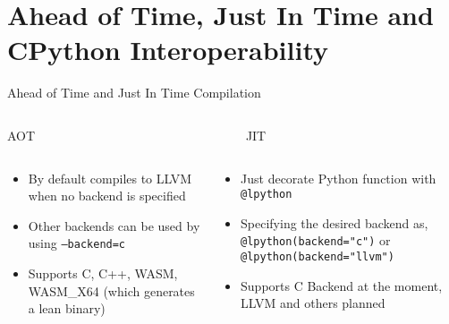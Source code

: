 \section{Ahead of Time, Just In Time and CPython Interoperability}

\begin{frame}{Ahead of Time and Just In Time Compilation}
    \begin{columns}
        \begin{column}{0.5\textwidth}
            \centering AOT
        \end{column}
        \begin{column}{0.5\textwidth}
            \centering JIT
        \end{column}
    \end{columns}
    \begin{columns}
        \begin{column}{0.5\textwidth}
            \begin{itemize}
                \item By default compiles to LLVM when no backend is specified
                \item Other backends can be used by using \texttt{--backend=c}
                \item Supports C, C++, WASM, WASM\_X64 (which generates a lean binary)
            \end{itemize}
        \end{column}
        \begin{column}{0.5\textwidth}
            \begin{itemize}
                \item Just decorate Python function with \texttt{@lpython}
                \item Specifying the desired backend as, \texttt{@lpython(backend="c")} or \texttt{@lpython(backend="llvm")}
                \item Supports C Backend at the moment, LLVM and others planned
            \end{itemize}
        \end{column}
    \end{columns}
\end{frame}

